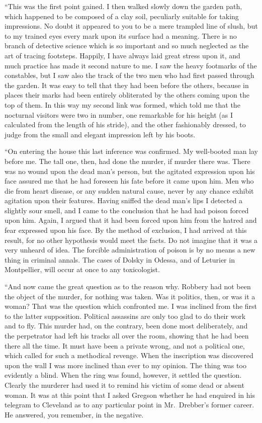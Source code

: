 \documentclass[12pt,english,oneside]{book}
\begin{document}
{}``This was the first point gained. I then walked slowly down the
garden path, which happened to be composed of a clay soil, peculiarly
suitable for taking impressions. No doubt it appeared to you to be
a mere trampled line of slush, but to my trained eyes every mark upon
its surface had a meaning. There is no branch of detective science
which is so important and so much neglected as the art of tracing
footsteps. Happily, I have always laid great stress upon it, and much
practice has made it second nature to me. I saw the heavy footmarks
of the constables, but I saw also the track of the two men who had
first passed through the garden. It was easy to tell that they had
been before the others, because in places their marks had been entirely
obliterated by the others coming upon the top of them. In this way
my second link was formed, which told me that the nocturnal visitors
were two in number, one remarkable for his height (as I calculated
from the length of his stride), and the other fashionably dressed,
to judge from the small and elegant impression left by his boots.

{}``On entering the house this last inference was confirmed. My well-booted
man lay before me. The tall one, then, had done the murder, if murder
there was. There was no wound upon the dead man's person, but the
agitated expression upon his face assured me that he had foreseen
his fate before it came upon him. Men who die from heart disease,
or any sudden natural cause, never by any chance exhibit agitation
upon their features. Having sniffed the dead man's lips I detected
a slightly sour smell, and I came to the conclusion that he had had
poison forced upon him. Again, I argued that it had been forced upon
him from the hatred and fear expressed upon his face. By the method
of exclusion, I had arrived at this result, for no other hypothesis
would meet the facts. Do not imagine that it was a very unheard of
idea. The forcible administration of poison is by no means a new thing
in criminal annals. The cases of Dolsky in Odessa, and of Leturier
in Montpellier, will occur at once to any toxicologist.

{}``And now came the great question as to the reason why. Robbery
had not been the object of the murder, for nothing was taken. Was
it politics, then, or was it a woman? That was the question which
confronted me. I was inclined from the first to the latter supposition.
Political assassins are only too glad to do their work and to fly.
This murder had, on the contrary, been done most deliberately, and
the perpetrator had left his tracks all over the room, showing that
he had been there all the time. It must have been a private wrong,
and not a political one, which called for such a methodical revenge.
When the inscription was discovered upon the wall I was more inclined
than ever to my opinion. The thing was too evidently a blind. When
the ring was found, however, it settled the question. Clearly the
murderer had used it to remind his victim of some dead or absent woman.
It was at this point that I asked Gregson whether he had enquired
in his telegram to Cleveland as to any particular point in Mr.\ Drebber's
former career. He answered, you remember, in the negative.
\end{document}
